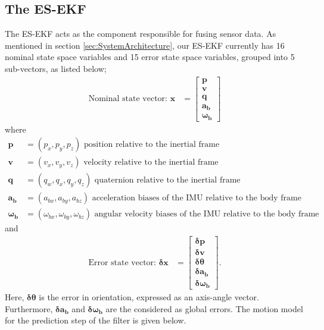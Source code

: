 \subsection{The \acrlong{ES-EKF}}
The \gls{ES-EKF} acts as the component responsible for fusing sensor data. As mentioned in section \ref{sec:SystemArchitecture}, our \gls{ES-EKF} currently has 16 nominal state space variables and 15 error state space variables, grouped into 5 sub-vectors, as listed below;
\begin{align}
    \text{Nominal state vector: }\textbf{x} &= \left[\begin{matrix}{}\textbf{p}\\\textbf{v}\\\textbf{q}\\\boldsymbol{a_b}\\\boldsymbol{\omega_b}\end{matrix}\right]
\end{align}
where
\begin{align}
    \textbf{p} &= (p_x, p_y, p_z) \text{ position relative to the inertial frame} \nonumber \\
    \textbf{v} &= (v_x, v_y, v_z) \text{ velocity relative to the inertial frame} \nonumber \\
    \textbf{q} &= (q_w, q_x, q_y, q_z) \text{ quaternion relative to the inertial frame} \nonumber \\
    \boldsymbol{a_b} &= (a_{bx}, a_{by}, a_{bz}) \text{ acceleration biases of the IMU relative to the body frame} \nonumber \\
    \boldsymbol{\omega_b} &= (\omega_{bx}, \omega_{by}, \omega_{bz}) \text{ angular velocity biases of the IMU relative to the body frame}
\end{align}
and
\begin{align}
	\text{Error state vector: }\boldsymbol{\delta}\textbf{x} &= \left[\begin{matrix}{}\boldsymbol{\delta}\textbf{p}\\\boldsymbol{\delta}\textbf{v}\\\boldsymbol{\delta}\boldsymbol{\theta}\\\boldsymbol{\delta}\boldsymbol{a_b}\\\boldsymbol{\delta}\boldsymbol{\omega_b}\end{matrix}\right].
\end{align}
Here, $\boldsymbol{\delta}\boldsymbol{\theta}$ is the error in orientation, expressed as an axis-angle vector. Furthermore, $\boldsymbol{\delta}\boldsymbol{a_b}$ and $\boldsymbol{\delta}\boldsymbol{\omega_b}$ are the considered as global errors. The motion model for the prediction step of the filter is given below.\\
